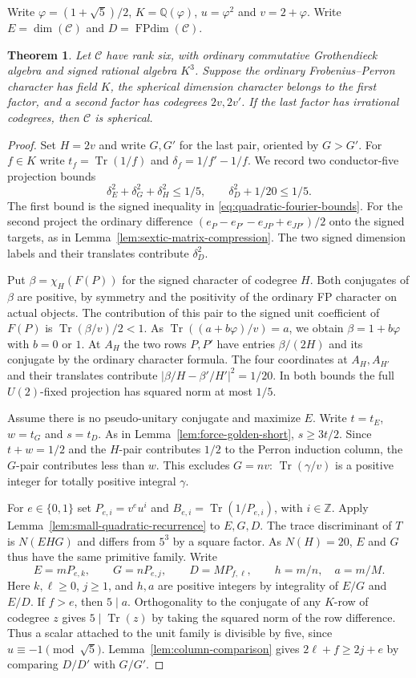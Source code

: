 \documentclass[11pt,reqno]{amsart}
\newtheorem{theorem}{Theorem}[section]
\theoremstyle{remark}\newtheorem{remark}[theorem]{Remark}
\numberwithin{equation}{section}
\begin{document}
Write $\varphi=(1+\sqrt5)/2$, $K=\mathbb Q(\varphi)$, $u=\varphi^2$
and $v=2+\varphi$. Write $E=\dim(\mathcal C)$ and
$D=\operatorname{FPdim}(\mathcal C)$.
\begin{theorem}\label{thm:q5-three-short}
Let $\mathcal C$ have rank six, with ordinary commutative Grothendieck
algebra and signed rational algebra $K^3$. Suppose the ordinary
Frobenius--Perron character has field $K$, the spherical dimension
character belongs to the first factor, and a second factor has
codegrees $2v,2v'$. If the last factor has irrational codegrees,
then $\mathcal C$ is spherical.
\end{theorem}
\begin{proof}
Set $H=2v$ and write $G,G'$ for the last pair, oriented by $G>G'$.
For $f\in K$ write $t_f=\operatorname{Tr}(1/f)$ and
$\delta_f=1/f'-1/f$. We record two conductor-five projection bounds
\[
 \delta_E^2+\delta_G^2+\delta_H^2\le1/5,\qquad
 \delta_D^2+1/20\le1/5.
\]
The first bound is the signed inequality in
\eqref{eq:quadratic-fourier-bounds}. For the second project the
ordinary difference $(e_P-e_{P'}-e_{JP}+e_{JP'})/2$ onto the signed targets, as in Lemma~\ref{lem:sextic-matrix-compression}.
The two signed dimension labels and their translates contribute
$\delta_D^2$.

Put $\beta=\chi_H(F(P))$ for the signed character of codegree $H$.
Both conjugates of $\beta$ are positive, by symmetry and the
positivity of the ordinary FP character on actual objects.
The contribution of this pair to the signed unit coefficient of
$F(P)$ is $\operatorname{Tr}(\beta/v)/2<1$.
As $\operatorname{Tr}((a+b\varphi)/v)=a$, we obtain
$\beta=1+b\varphi$ with $b=0$ or $1$. At $A_H$ the two rows
$P,P'$ have entries $\beta/(2H)$ and its conjugate by the
ordinary character formula. The four coordinates at $A_H,A_{H'}$
and their translates contribute
$|\beta/H-\beta'/H'|^2=1/20$. In both bounds the full
$U(2)$-fixed projection has squared norm at most $1/5$.

Assume there is no pseudo-unitary conjugate and maximize $E$.
Write $t=t_E$, $w=t_G$ and $s=t_D$. As in
Lemma~\ref{lem:force-golden-short}, $s\ge3t/2$. Since $t+w=1/2$
and the $H$-pair contributes $1/2$ to the Perron induction column,
the $G$-pair contributes less than $w$. This excludes $G=nv$:
$\operatorname{Tr}(\gamma/v)$ is a positive integer for totally
positive integral $\gamma$.

For $e\in\{0,1\}$ set $P_{e,i}=v^e u^i$ and
$B_{e,i}=\operatorname{Tr}(1/P_{e,i})$, with $i\in\mathbb Z$.
Apply Lemma~\ref{lem:small-quadratic-recurrence} to $E,G,D$.
The trace discriminant of $T$ is $N(EHG)$ and differs from $5^3$
by a square factor. As $N(H)=20$, $E$ and $G$ thus have the same
primitive family. Write
\[
 E=mP_{e,k},\qquad G=nP_{e,j},\qquad D=MP_{f,\ell},
 \qquad h=m/n,\quad a=m/M.
\]
Here $k,\ell\ge0$, $j\ge1$, and $h,a$ are positive integers by
integrality of $E/G$ and $E/D$. If $f>e$, then $5\mid a$.
Orthogonality to the conjugate of any $K$-row of codegree $z$
gives $5\mid\operatorname{Tr}(z)$ by taking the squared norm
of the row difference. Thus a scalar attached to the unit family
is divisible by five, since $u\equiv-1\pmod{\sqrt5}$.
Lemma~\ref{lem:column-comparison} gives
$2\ell+f\ge2j+e$ by comparing $D/D'$ with $G/G'$.


\end{proof}
\end{document}
